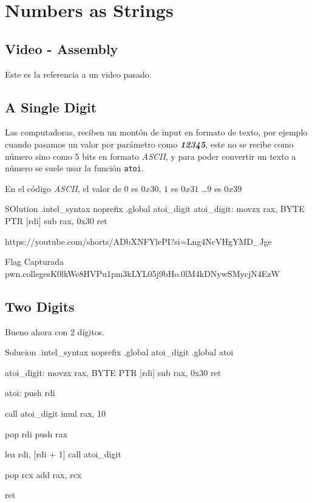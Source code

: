 \section{Numbers as Strings}\label{sec:11numbers_as_strings}
\subsection{Video - Assembly}
Este es la referencia a un video pasado.
\subsection{A Single Digit}\label{subsec:11-01a_single_digit}

Las computadoras, reciben un montón de input en formato de texto, por ejemplo
cuando pasamos un valor por parámetro como \textbf{\textit{12345}}, este no se recibe como número
sino como 5 bits en formato \textit{ASCII}, y para poder convertir un texto a número
se suele usar la función \texttt{atoi}.

En el código \textit{ASCII}, el valor de \( 0 \) es \( 0x30 \), \( 1 \) es \( 0x31 \) \dots \( 9 \) es \( 0x39 \)
\begin{codebox}[ASM]{SOlution}
	.intel_syntax noprefix
	.global atoi_digit
	atoi_digit:
	movzx rax, BYTE PTR [rdi]
	sub rax, 0x30
	ret
\end{codebox}
https://youtube.com/shorts/ADbXNFYlePI?si=Lng4NcVHgYMD_Jge
\begin{flagbox}{Flag Capturada}
	pwn.college{sK0lkWe8HVPu1pm3kLYL05j9bHo.0lM4kDNywSMycjN4EzW}
\end{flagbox}
\subsection{Two Digits}\label{subsec:11-02two_digits}

Bueno ahora con 2 dígitos.

\begin{codebox}[ASM]{Solucion}
	.intel_syntax noprefix
	.global atoi_digit
	.global atoi

	atoi_digit:
	movzx rax, BYTE PTR [rdi]
	sub rax, 0x30
	ret

	atoi:
	push rdi

	call atoi_digit
	imul rax, 10

	pop rdi
	push rax

	lea rdi, [rdi + 1]
	call atoi_digit

	pop rcx
	add rax, rcx

	ret
\end{codebox}


